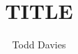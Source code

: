 \newcommand{\coursename}{COURSE NAME}
\newcommand{\coursecode}{COURSE CODE}
\newcommand{\courseinfo}{}
\newcommand{\Author}{Todd Davies} 
\newcommand{\Title}{TITLE}
\author{\Author}
\title{\Title}
